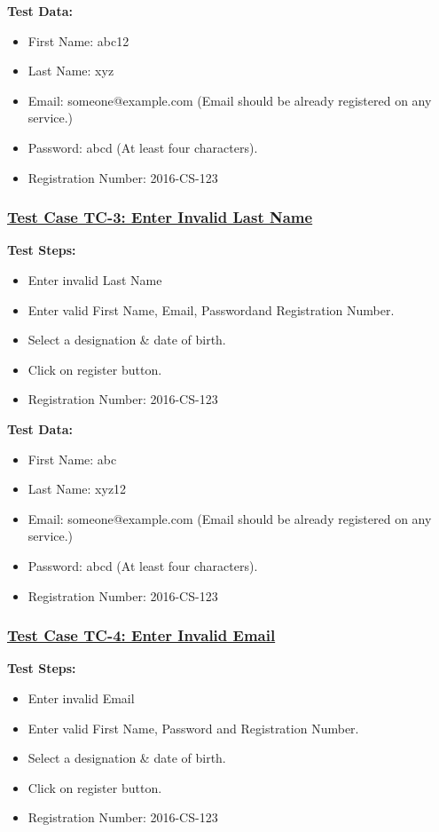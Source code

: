 \textbf{Test Data:}
\begin{itemize}

\item First Name: abc12
\item Last Name: xyz
\item Email: someone@example.com (Email should be already registered on any service.)
\item Password: abcd (At least four characters).
\item Registration Number: 2016-CS-123

\end{itemize}

\subsubsection{\underline{Test Case TC-3: Enter Invalid Last Name}}
\textbf{Test Steps:}
\begin{itemize}

\item Enter invalid Last Name
\item Enter valid First Name, Email, Passwordand Registration Number.
\item Select a designation \& date of birth.
\item Click on register button.
\item Registration Number: 2016-CS-123

\end{itemize}

\textbf{Test Data:}
\begin{itemize}

\item First Name: abc
\item Last Name: xyz12
\item Email: someone@example.com (Email should be already registered on any service.)
\item Password: abcd (At least four characters).
\item Registration Number: 2016-CS-123

\end{itemize}

\subsubsection{\underline{Test Case TC-4: Enter Invalid Email}}
\textbf{Test Steps:}
\begin{itemize}

\item Enter invalid Email
\item Enter valid First Name, Password and Registration Number.
\item Select a designation \& date of birth.
\item Click on register button.
\item Registration Number: 2016-CS-123

\end{itemize}

